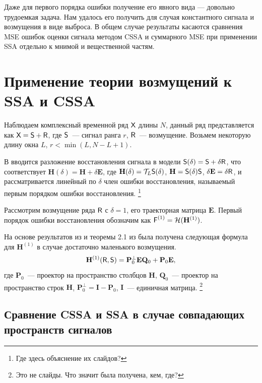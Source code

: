 \documentclass[specialist,
               substylefile = spbu.rtx,
               subf,href,colorlinks=true, 12pt]{disser}
\begin{document}
Даже для первого порядка ошибки получение его явного вида --- довольно трудоемкая задача. Нам удалось его получить для случая константного сигнала и возмущения в виде выброса. В общем случае результаты касаются сравнения MSE ошибок оценки сигнала методом CSSA и суммарного MSE при применении SSA отдельно к мнимой и вещественной частям.


\section{Применение теории возмущений к SSA и CSSA}

Наблюдаем комплексный временной ряд $\textsf{X}$ длины $N$, данный ряд представляется как $\textsf{X} = \textsf{S} + \textsf{R}$, где $\textsf{S}$~--- сигнал ранга $r$, $\textsf{R}$~--- возмущение.  Возьмем некоторую длину окна $L$, $r<\min(L, N-L+1)$.

В \cite{Nekrutkin} вводится разложение восстановления сигнала в модели $\textsf{S}(\delta) = \textsf{S} + \delta \textsf{R}$, что соответствует $\mathbf{H}(\delta) = \mathbf{H} + \delta \mathbf{E}$, где $\mathbf{H}(\delta) = \mathcal{T}_L \textsf{S}(\delta)$, $\mathbf{H} = \textsf{S}(\delta)\textsf{S}$, $\delta\mathbf{E} = \delta \textsf{R}$, и рассматривается линейный по $\delta$ член ошибки восстановления, называемый первым порядком ошибки восстановления.
\footnote{Где здесь объяснение их слайдов?}

Рассмотрим возмущение ряда $\textsf{R}$ с $\delta = 1$, его траекторная матрица $\mathbf{E}$. Первый порядок ошибки восстановления обозначим как $\textsf{F}^{(1)} = \mathcal{H}(\mathbf{H}^{(1)})$.

На основе результатов из \cite[стр.12]{Konstantinov} и теоремы 2.1 из \cite{Nekrutkin} была получена следующая формула для $\mathbf{H}^{(1)}$ в случае достаточно маленького возмущения.
\begin{equation} \label{eq:main}
	\mathbf{H}^{(1)}(\textsf{R}, \textsf{S}) = \mathbf{P}^{\perp}_0 \mathbf{E} \mathbf{Q}_0 + \mathbf{P}_0 \mathbf{E},
\end{equation}
где $\mathbf{P}_0$~--- проектор на пространство столбцов $\mathbf{H}$, $\mathbf{Q}_0$~--- проектор на пространство строк $\mathbf{H}$, $\mathbf{P}^{\perp}_0 = \mathbf{I} - \mathbf{P}_0$, $\mathbf{I}$~--- единичная матрица.
\footnote{Это не слайды. Что значит была получена, кем, где?}

\subsection{Сравнение CSSA и SSA в случае совпадающих пространств сигналов}
\end{document}

